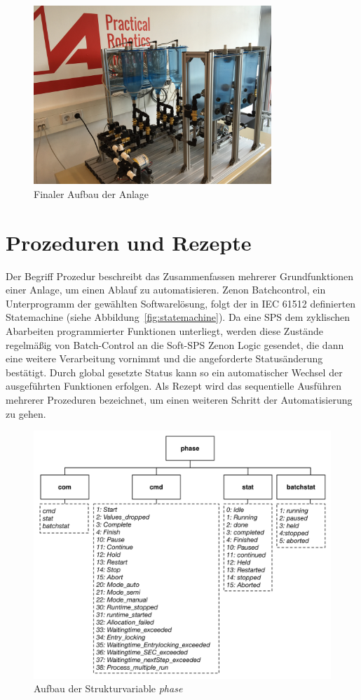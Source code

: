 	\begin{figure}[h!]
	  \centering
	  \includegraphics[width=0.8\textwidth]{graphics/implementation/FinalerAufbau.jpg}
	  \caption{Finaler Aufbau der Anlage}
	  \label{fig:finaler_aufbau}
	\end{figure}	

	\section{Prozeduren und Rezepte}
	Der Begriff Prozedur beschreibt das Zusammenfassen mehrerer Grundfunktionen einer Anlage, um einen Ablauf zu automatisieren. Zenon Batchcontrol, ein Unterprogramm der gewählten Softwarelösung, folgt der in IEC 61512 definierten Statemachine (siehe Abbildung~\ref{fig:statemachine}). Da eine \ac{SPS} dem zyklischen Abarbeiten programmierter Funktionen unterliegt, werden diese Zustände regelmäßig von Batch-Control an die Soft-\ac{SPS} Zenon Logic gesendet, die dann eine weitere Verarbeitung vornimmt und die angeforderte Statusänderung bestätigt. Durch global gesetzte Status kann so ein automatischer Wechsel der ausgeführten Funktionen erfolgen. Als Rezept wird das sequentielle Ausführen mehrerer Prozeduren bezeichnet, um einen weiteren Schritt der Automatisierung zu gehen.\\

\begin{figure}[h!]
  \centering
  \includegraphics[height=0.6\textwidth]{graphics/implementation/Datentyp_Phase.jpg}
  \caption{Aufbau der Strukturvariable \glqq \textit{phase}\grqq}
  \label{fig:var_phase}
\end{figure}
	
